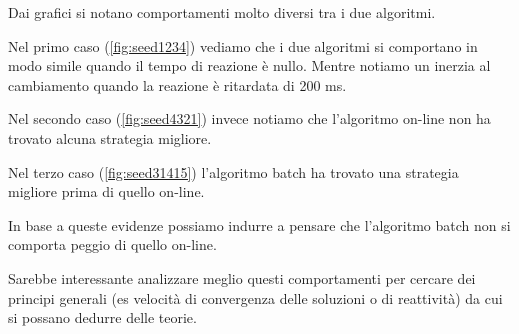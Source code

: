 \documentclass[a4paper,11pt]{article}
\begin{document}
Dai grafici si notano comportamenti molto diversi tra i due algoritmi.

Nel primo caso (\ref{fig:seed1234}) vediamo che i due algoritmi si comportano in modo simile
quando il tempo di reazione è nullo.
Mentre notiamo un inerzia al cambiamento quando la reazione è ritardata di 200 ms.

Nel secondo caso (\ref{fig:seed4321}) invece notiamo che l'algoritmo on-line non ha trovato alcuna
strategia migliore.

Nel terzo caso (\ref{fig:seed31415}) l'algoritmo batch ha trovato una strategia migliore prima di quello on-line.

In base a queste evidenze possiamo indurre a pensare che l'algoritmo batch non si comporta peggio di quello on-line.

Sarebbe interessante analizzare meglio questi comportamenti per cercare dei principi generali (es velocità di convergenza delle soluzioni o di reattività) da cui si possano dedurre delle teorie.
\end{document}
